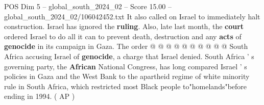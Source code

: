 \begin{textsample}{POS Dim 5 – global\_south\_2024\_02 – Score 15.00 – global\_south\_2024\_02/106042452.txt}
It also called on Israel to immediately halt construction.
Israel has ignored the \textbf{ruling}.
Also, late last month, the \textbf{court} ordered Israel to do all it can to prevent death, destruction and any \textbf{acts} of \textbf{genocide} in its campaign in Gaza.
The order @ @ @ @ @ @ @ @ @ @ South Africa accusing Israel of \textbf{genocide}, a charge that Israel denied.
South Africa ' s governing party, the \textbf{African} National Congress, has long compared Israel ' s policies in Gaza and the West Bank to the apartheid regime of white minority rule in South Africa, which restricted most Black people to"homelands"before ending in 1994. ( AP )

\end{textsample}
